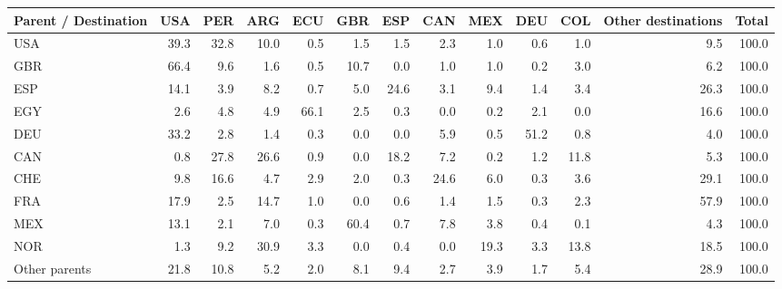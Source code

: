 \begin{tabular}{lrrrrrrrrrrrr}
\toprule
Parent / Destination & USA & PER & ARG & ECU & GBR & ESP & CAN & MEX & DEU & COL & Other destinations & Total \\
\midrule
USA & 39.3 & 32.8 & 10.0 & 0.5 & 1.5 & 1.5 & 2.3 & 1.0 & 0.6 & 1.0 & 9.5 & 100.0 \\
GBR & 66.4 & 9.6 & 1.6 & 0.5 & 10.7 & 0.0 & 1.0 & 1.0 & 0.2 & 3.0 & 6.2 & 100.0 \\
ESP & 14.1 & 3.9 & 8.2 & 0.7 & 5.0 & 24.6 & 3.1 & 9.4 & 1.4 & 3.4 & 26.3 & 100.0 \\
EGY & 2.6 & 4.8 & 4.9 & 66.1 & 2.5 & 0.3 & 0.0 & 0.2 & 2.1 & 0.0 & 16.6 & 100.0 \\
DEU & 33.2 & 2.8 & 1.4 & 0.3 & 0.0 & 0.0 & 5.9 & 0.5 & 51.2 & 0.8 & 4.0 & 100.0 \\
CAN & 0.8 & 27.8 & 26.6 & 0.9 & 0.0 & 18.2 & 7.2 & 0.2 & 1.2 & 11.8 & 5.3 & 100.0 \\
CHE & 9.8 & 16.6 & 4.7 & 2.9 & 2.0 & 0.3 & 24.6 & 6.0 & 0.3 & 3.6 & 29.1 & 100.0 \\
FRA & 17.9 & 2.5 & 14.7 & 1.0 & 0.0 & 0.6 & 1.4 & 1.5 & 0.3 & 2.3 & 57.9 & 100.0 \\
MEX & 13.1 & 2.1 & 7.0 & 0.3 & 60.4 & 0.7 & 7.8 & 3.8 & 0.4 & 0.1 & 4.3 & 100.0 \\
NOR & 1.3 & 9.2 & 30.9 & 3.3 & 0.0 & 0.4 & 0.0 & 19.3 & 3.3 & 13.8 & 18.5 & 100.0 \\
Other parents & 21.8 & 10.8 & 5.2 & 2.0 & 8.1 & 9.4 & 2.7 & 3.9 & 1.7 & 5.4 & 28.9 & 100.0 \\
\bottomrule
\end{tabular}
